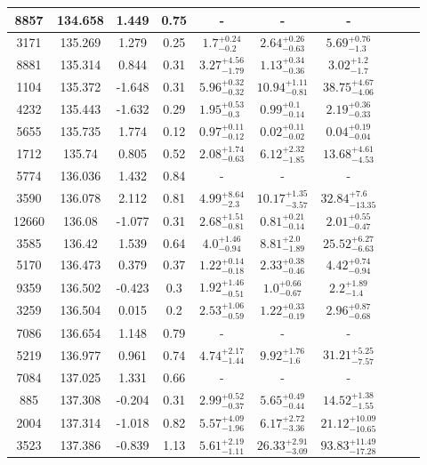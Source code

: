 \documentclass[fleqn,usenatbib]{mnras}
\begin{document}
\begin{table}
\begin{center}
\begin{tabular}{cccccccccc}
\hline
8857 & 134.658 & 1.449 & 0.75 & - & - & - \\ 
\hline
3171 & 135.269 & 1.279 & 0.25 & $1.7^{+0.24}_{-0.2}$ & $2.64^{+0.26}_{-0.63}$ & $5.69^{+0.76}_{-1.3}$ \\ 
\hline
8881 & 135.314 & 0.844 & 0.31 & $3.27^{+4.56}_{-1.79}$ & $1.13^{+0.34}_{-0.36}$ & $3.02^{+1.2}_{-1.7}$ \\ 
\hline
1104 & 135.372 & -1.648 & 0.31 & $5.96^{+0.32}_{-0.32}$ & $10.94^{+1.11}_{-0.81}$ & $38.75^{+4.67}_{-4.06}$ \\ 
\hline
4232 & 135.443 & -1.632 & 0.29 & $1.95^{+0.53}_{-0.3}$ & $0.99^{+0.1}_{-0.14}$ & $2.19^{+0.36}_{-0.33}$ \\ 
\hline
5655 & 135.735 & 1.774 & 0.12 & $0.97^{+0.11}_{-0.12}$ & $0.02^{+0.11}_{-0.02}$ & $0.04^{+0.19}_{-0.04}$ \\ 
\hline
1712 & 135.74 & 0.805 & 0.52 & $2.08^{+1.74}_{-0.63}$ & $6.12^{+2.32}_{-1.85}$ & $13.68^{+4.61}_{-4.53}$ \\ 
\hline
5774 & 136.036 & 1.432 & 0.84 & - & - & - \\ 
\hline
3590 & 136.078 & 2.112 & 0.81 & $4.99^{+8.64}_{-2.3}$ & $10.17^{+1.35}_{-3.57}$ & $32.84^{+7.6}_{-13.35}$ \\ 
\hline
12660 & 136.08 & -1.077 & 0.31 & $2.68^{+1.51}_{-0.81}$ & $0.81^{+0.21}_{-0.14}$ & $2.01^{+0.55}_{-0.47}$ \\ 
\hline
3585 & 136.42 & 1.539 & 0.64 & $4.0^{+1.46}_{-0.94}$ & $8.81^{+2.0}_{-1.89}$ & $25.52^{+6.27}_{-6.63}$ \\ 
\hline
5170 & 136.473 & 0.379 & 0.37 & $1.22^{+0.14}_{-0.18}$ & $2.33^{+0.38}_{-0.46}$ & $4.42^{+0.74}_{-0.94}$ \\ 
\hline
9359 & 136.502 & -0.423 & 0.3 & $1.92^{+1.46}_{-0.51}$ & $1.0^{+0.66}_{-0.67}$ & $2.2^{+1.89}_{-1.4}$ \\ 
\hline
3259 & 136.504 & 0.015 & 0.2 & $2.53^{+1.06}_{-0.59}$ & $1.22^{+0.33}_{-0.19}$ & $2.96^{+0.87}_{-0.68}$ \\ 
\hline
7086 & 136.654 & 1.148 & 0.79 & - & - & - \\ 
\hline
5219 & 136.977 & 0.961 & 0.74 & $4.74^{+2.17}_{-1.44}$ & $9.92^{+1.76}_{-1.6}$ & $31.21^{+5.25}_{-7.57}$ \\ 
\hline
7084 & 137.025 & 1.331 & 0.66 & - & - & - \\ 
\hline
885 & 137.308 & -0.204 & 0.31 & $2.99^{+0.52}_{-0.37}$ & $5.65^{+0.49}_{-0.44}$ & $14.52^{+1.38}_{-1.55}$ \\ 
\hline
2004 & 137.314 & -1.018 & 0.82 & $5.57^{+4.09}_{-1.96}$ & $6.17^{+2.72}_{-3.36}$ & $21.12^{+10.09}_{-10.65}$ \\ 
\hline
3523 & 137.386 & -0.839 & 1.13 & $5.61^{+2.19}_{-1.11}$ & $26.33^{+2.91}_{-3.09}$ & $93.83^{+11.49}_{-17.28}$ \\ 
\hline
\end{tabular}
\end{center}
\end{table}
\end{document}
